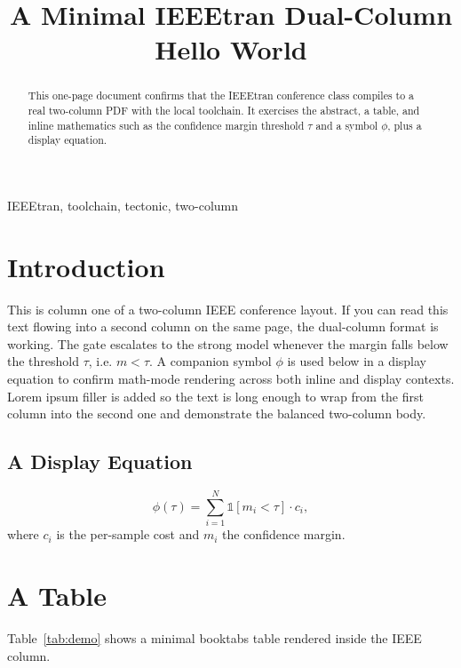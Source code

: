 \documentclass[conference]{IEEEtran}
\begin{document}
\title{A Minimal IEEEtran Dual-Column Hello World}

\author{
}

\maketitle

\begin{abstract}
This one-page document confirms that the IEEEtran conference class compiles to a
real two-column PDF with the local toolchain. It exercises the abstract, a table,
and inline mathematics such as the confidence margin threshold $\tau$ and a symbol
$\phi$, plus a display equation.
\end{abstract}

\begin{IEEEkeywords}
IEEEtran, toolchain, tectonic, two-column
\end{IEEEkeywords}

\section{Introduction}
This is column one of a two-column IEEE conference layout. If you can read this
text flowing into a second column on the same page, the dual-column format is
working. The gate escalates to the strong model whenever the margin falls below
the threshold $\tau$, i.e. $m < \tau$. A companion symbol $\phi$ is used below in
a display equation to confirm math-mode rendering across both inline and display
contexts. Lorem ipsum filler is added so the text is long enough to wrap from the
first column into the second one and demonstrate the balanced two-column body.

\subsection{A Display Equation}
\begin{equation}
\phi(\tau) = \sum_{i=1}^{N} \mathbb{1}\!\left[m_i < \tau\right] \cdot c_i,
\end{equation}
where $c_i$ is the per-sample cost and $m_i$ the confidence margin.

\section{A Table}
Table~\ref{tab:demo} shows a minimal booktabs table rendered inside the
IEEE column.
\end{document}
